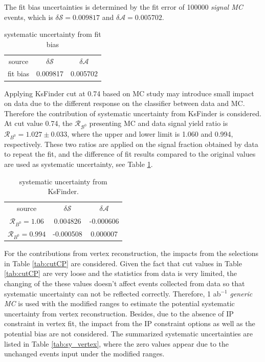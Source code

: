 The fit bias uncertainties is determined by the fit error of 100000 \textit{signal MC} events, which is $\delta {\mathcal{S}}=0.009817$ and $\delta {\mathcal{A}}=0.005702$.
\begin{table}[H]
	\begin{minipage}[b]{1.0\linewidth}
		\centering
		\caption{systematic uncertainty from fit bias}
		\begin{tabular}{c c c}
			\hline
			source & $\delta \mathcal{S}$ & $\delta \mathcal{A}$ \\
			fit bias & 0.009817 & 0.005702\\
			\hline
		\end{tabular}
	\end{minipage}
\end{table}

Applying KsFinder cut at 0.74 based on MC study may introduce small impact on data due to the different response on the classifier between data and MC. Therefore the contribution of systematic uncertainty from KsFinder is considered. At cut value  0.74, the $\mathcal{R_{B^0}}$ presenting MC and data signal yield ratio is $\mathcal{R}_{B^0} = 1.027 \pm 0.033$, where the upper and lower limit is 1.060 and 0.994, respectively. These two ratios are applied on the signal fraction obtained by data to repeat the fit, and the difference of fit results compared to the original values are used as systematic uncertainty, see Table \ref{tab:sy_ks}.

\begin{table}[H]
	\begin{minipage}[b]{1.0\linewidth}
		\centering
		\caption{systematic uncertainty from KsFinder.}
		\label{tab:sy_ks}
		\begin{tabular}{c c c}
			\hline
			source & $\delta \mathcal{S}$ & $\delta \mathcal{A}$ \\
			$\mathcal{R}_{B^0}=1.06$ & 0.004826
 & -0.000606\\
			$\mathcal{R}_{B^0}=0.994$ & -0.000508
& 0.000007
\\
			\hline
		\end{tabular}
	\end{minipage}
\end{table}

For the contributions from vertex reconstruction, the impacts from the selections in Table \ref{tab:cutCP} are considered. Given the fact that cut values in Table \ref{tab:cutCP} are very loose and the statistics from data is very limited, the changing of the these values doesn't affect events collected from data so that systematic uncertainty can not be reflected correctly. Therefore, 1 ab$^{-1}$ \textit{generic MC} is used with the modified ranges to estimate the potential systematic uncertainty from vertex reconstruction. Besides, due to the absence of IP constraint in vertex fit, the impact from the IP constraint options as well as the potential bias are not considered. The summarized systematic uncertainties are listed in Table \ref{tab:sy_vertex}, where the zero values appear due to the unchanged events input under the modified ranges.

